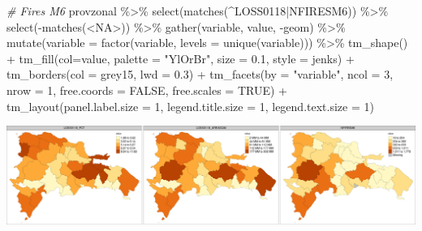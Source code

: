 \documentclass[10pt,landscape,a3paper]{article}
\newenvironment{Shaded}{\begin{snugshade}}{\end{snugshade}}
\newcommand{\AttributeTok}[1]{\textcolor[rgb]{0.77,0.63,0.00}{#1}}
\newcommand{\CommentTok}[1]{\textcolor[rgb]{0.56,0.35,0.01}{\textit{#1}}}
\newcommand{\ConstantTok}[1]{\textcolor[rgb]{0.00,0.00,0.00}{#1}}
\newcommand{\DecValTok}[1]{\textcolor[rgb]{0.00,0.00,0.81}{#1}}
\newcommand{\FloatTok}[1]{\textcolor[rgb]{0.00,0.00,0.81}{#1}}
\newcommand{\FunctionTok}[1]{\textcolor[rgb]{0.00,0.00,0.00}{#1}}
\newcommand{\NormalTok}[1]{#1}
\newcommand{\SpecialCharTok}[1]{\textcolor[rgb]{0.00,0.00,0.00}{#1}}
\newcommand{\StringTok}[1]{\textcolor[rgb]{0.31,0.60,0.02}{#1}}
\begin{document}
\begin{Shaded}
\begin{Highlighting}[]

\CommentTok{\# Fires M6}
\NormalTok{provzonal }\SpecialCharTok{\%\textgreater{}\%} \FunctionTok{select}\NormalTok{(}\FunctionTok{matches}\NormalTok{(}\StringTok{\textquotesingle{}\^{}LOSS0118|NFIRESM6\textquotesingle{}}\NormalTok{)) }\SpecialCharTok{\%\textgreater{}\%} \FunctionTok{select}\NormalTok{(}\SpecialCharTok{{-}}\FunctionTok{matches}\NormalTok{(}\StringTok{\textquotesingle{}\textless{}NA\textgreater{}\textquotesingle{}}\NormalTok{)) }\SpecialCharTok{\%\textgreater{}\%} 
  \FunctionTok{gather}\NormalTok{(variable, value, }\SpecialCharTok{{-}}\NormalTok{geom) }\SpecialCharTok{\%\textgreater{}\%}
  \FunctionTok{mutate}\NormalTok{(}\AttributeTok{variable =} \FunctionTok{factor}\NormalTok{(variable, }\AttributeTok{levels =} \FunctionTok{unique}\NormalTok{(variable))) }\SpecialCharTok{\%\textgreater{}\%} 
  \FunctionTok{tm\_shape}\NormalTok{() }\SpecialCharTok{+}
  \FunctionTok{tm\_fill}\NormalTok{(}\AttributeTok{col=}\StringTok{\textquotesingle{}value\textquotesingle{}}\NormalTok{, }\AttributeTok{palette =} \StringTok{"YlOrBr"}\NormalTok{, }\AttributeTok{size =} \FloatTok{0.1}\NormalTok{, }\AttributeTok{style =} \StringTok{\textquotesingle{}jenks\textquotesingle{}}\NormalTok{) }\SpecialCharTok{+}
  \FunctionTok{tm\_borders}\NormalTok{(}\AttributeTok{col =} \StringTok{\textquotesingle{}grey15\textquotesingle{}}\NormalTok{, }\AttributeTok{lwd =} \FloatTok{0.3}\NormalTok{) }\SpecialCharTok{+}
  \FunctionTok{tm\_facets}\NormalTok{(}\AttributeTok{by =} \StringTok{"variable"}\NormalTok{, }\AttributeTok{ncol =} \DecValTok{3}\NormalTok{, }\AttributeTok{nrow =} \DecValTok{1}\NormalTok{, }\AttributeTok{free.coords =} \ConstantTok{FALSE}\NormalTok{, }\AttributeTok{free.scales =} \ConstantTok{TRUE}\NormalTok{) }\SpecialCharTok{+}
  \FunctionTok{tm\_layout}\NormalTok{(}\AttributeTok{panel.label.size =} \DecValTok{1}\NormalTok{, }\AttributeTok{legend.title.size =} \DecValTok{1}\NormalTok{, }\AttributeTok{legend.text.size =} \DecValTok{1}\NormalTok{)}
\end{Highlighting}
\end{Shaded}

\begin{center}\includegraphics{img/zonal-prov-6} \end{center}
\end{document}
